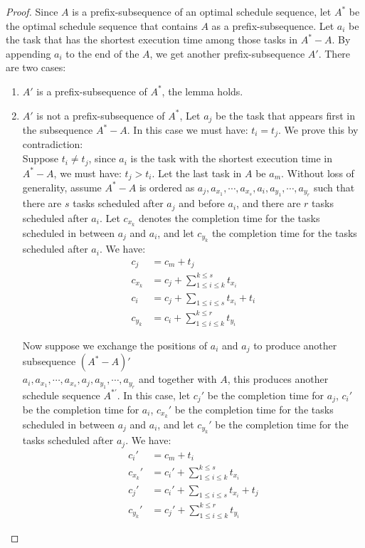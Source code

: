 \documentclass[11pt]{article}
\begin{document}
\begin{enumerate}
\begin{enumerate}
\begin{proof}
  Since $A$ is a prefix-subsequence of an optimal schedule sequence,
  let $A^*$ be the optimal schedule sequence that contains $A$ as a
  prefix-subsequence. Let $a_i$ be the task that has the shortest
  execution time among those tasks in $A^*-A$. By appending $a_i$ to
  the end of the $A$, we get another prefix-subsequence $A'$. There
  are two cases:
  \begin{enumerate}
  \item $A'$ is a prefix-subsequence of $A^*$, the lemma holds.
  \item $A'$ is not a prefix-subsequence of $A^*$, Let $a_j$ be the
    task that appears first in the subsequence $A^*-A$. In
    this case we must have: $t_i = t_j$. We prove this by 
    contradiction:\\
    Suppose $t_i \neq t_j$, since $a_i$ is the task with the shortest
    execution time in $A^*-A$, we must have: $t_j > t_i$. Let the last
    task in $A$ be $a_m$. Without loss of generality, assume $A^*-A$
    is ordered as
    $a_j,a_{x_1},\cdots,a_{x_s},a_i,a_{y_1},\cdots,a_{y_r}$ such that
    there are $s$ tasks scheduled after $a_j$ and before $a_i$, and
    there are $r$ tasks scheduled after $a_i$. Let $c_{x_k}$ denotes
    the completion time for the tasks scheduled in between $a_j$ and
    $a_i$, and let $c_{y_k}$ the completion time for the tasks
    scheduled after $a_i$. We have:
    \begin{align}
      c_j &= c_m + t_j\\
      c_{x_k} &= c_j + \sum_{1 \leq i \leq k}^{k \leq s}t_{x_i}\\
      c_i &= c_j + \sum_{1 \leq i \leq s}t_{x_i} + t_i\\
      c_{y_k} &= c_i + \sum_{1 \leq i \leq k}^{k \leq r}t_{y_i}
    \end{align}

    Now suppose we exchange the positions of $a_i$ and $a_j$ to
    produce another subsequence $(A^*-A)'$\\
    $a_i,a_{x_1},\cdots,a_{x_s},a_j,a_{y_1},\cdots,a_{y_r}$ and
    together with $A$, this produces another schedule sequence $A^{*'}$. In this
    case, let $c_j'$ be the completion time for $a_j$, $c_i'$ be the
    completion time for $a_i$, $c_{x_k}'$ be
    the completion time for the tasks scheduled in between $a_j$ and
    $a_i$, and let $c_{y_k}'$ be the completion time for the tasks
    scheduled after $a_j$. We have:
    \begin{align}
      c_i' &= c_m + t_i\\
      c_{x_k}' &= c_i' + \sum_{1 \leq i \leq k}^{k \leq s}t_{x_i}\\
      c_j' &= c_i' + \sum_{1 \leq i \leq s}t_{x_i} + t_j\\
      c_{y_k}' &= c_j' + \sum_{1 \leq i \leq k}^{k \leq r}t_{y_i}
    \end{align}
    

\end{enumerate}
\end{proof}
\end{enumerate}
\end{enumerate}
\end{document}

